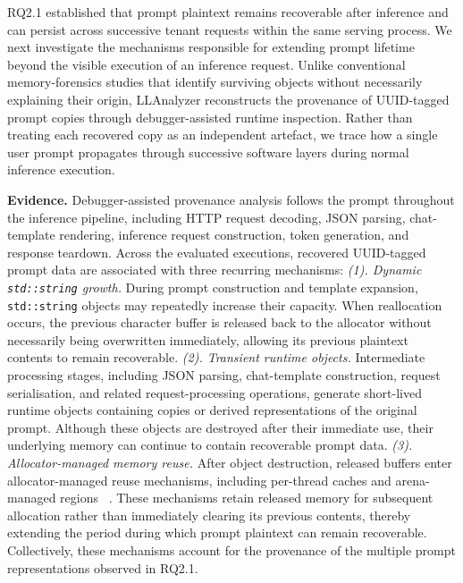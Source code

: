 \documentclass[journal,tifs]{IEEEtran}
\begin{document}
RQ2.1 established that prompt plaintext remains recoverable after
inference and can persist across successive tenant requests within the
same serving process. We next investigate the mechanisms responsible
for extending prompt lifetime beyond the visible execution of an
inference request. Unlike conventional memory-forensics studies that identify surviving
objects without necessarily explaining their origin, LLAnalyzer
reconstructs the provenance of UUID-tagged prompt copies through
debugger-assisted runtime inspection. Rather than treating each
recovered copy as an independent artefact, we trace how a single user
prompt propagates through successive software layers during normal
inference execution.


{\bf Evidence.}
Debugger-assisted provenance analysis follows the prompt throughout the
inference pipeline, including HTTP request decoding, JSON parsing,
chat-template rendering, inference request construction, token
generation, and response teardown. Across the evaluated executions,
recovered UUID-tagged prompt data are associated with three recurring
mechanisms:
\textit{(1). Dynamic \texttt{std::string} growth.}
During prompt construction and template expansion, \texttt{std::string}
objects may repeatedly increase their capacity. When reallocation
occurs, the previous character buffer is released back to the allocator
without necessarily being overwritten immediately, allowing its
previous plaintext contents to remain recoverable.
\textit{(2). Transient runtime objects.} 
Intermediate processing stages, including JSON parsing, chat-template
construction, request serialisation, and related request-processing
operations, generate short-lived runtime objects containing copies or
derived representations of the original prompt. Although these objects
are destroyed after their immediate use, their underlying memory can
continue to contain recoverable prompt data. 
\textit{(3). Allocator-managed memory reuse.}
After object destruction, released buffers enter allocator-managed
reuse mechanisms, including per-thread caches and arena-managed regions
~\cite{glibc_arena}. These mechanisms retain released memory for subsequent
allocation rather than immediately clearing its previous contents,
thereby extending the period during which prompt plaintext can remain
recoverable. 
%
%
Collectively, these mechanisms account for the provenance of the
multiple prompt representations observed in RQ2.1.
\end{document}
